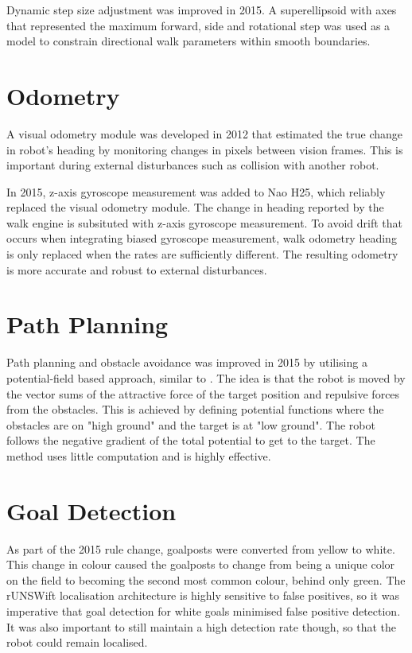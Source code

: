 \documentclass[runningheads,a4paper]{llncs}
\begin{document}
Dynamic step size adjustment was improved in 2015. A superellipsoid with axes that represented the maximum forward, side and rotational step was used as a model to constrain directional walk parameters within smooth boundaries.

\section{Odometry}
A visual odometry module was developed in 2012 that estimated the true change in robot's heading by monitoring changes in pixels between vision frames. This is important during external disturbances such as collision with another robot. 

In 2015, z-axis gyroscope measurement was added to Nao H25, which reliably replaced the visual odometry module. The change in heading reported by the walk engine is subsituted with z-axis gyroscope measurement. To avoid drift that occurs when integrating biased gyroscope measurement, walk odometry heading is only replaced when the rates are sufficiently different. The resulting odometry is more accurate and robust to external disturbances.

\section{Path Planning}
Path planning and obstacle avoidance was improved in 2015 by utilising a potential-field based approach, similar to \cite{potentialfields}. The idea is that the robot is moved by the vector sums of the attractive force of the target position and repulsive forces from the obstacles. This is achieved by defining potential functions where the obstacles are on "high ground" and the target is at "low ground". The robot follows the negative gradient of the total potential to get to the target. The method uses little computation and is highly effective.

\section{Goal Detection}

As part of the 2015 rule change, goalposts were converted from yellow to white. This change in colour caused the goalposts to change from being a unique color on the field to becoming the second most common colour, behind only green. The rUNSWift localisation architecture is highly sensitive to false positives, so it was imperative that goal detection for white goals minimised false positive detection. It was also important to still maintain a high detection rate though, so that the robot could remain localised.
\end{document}
